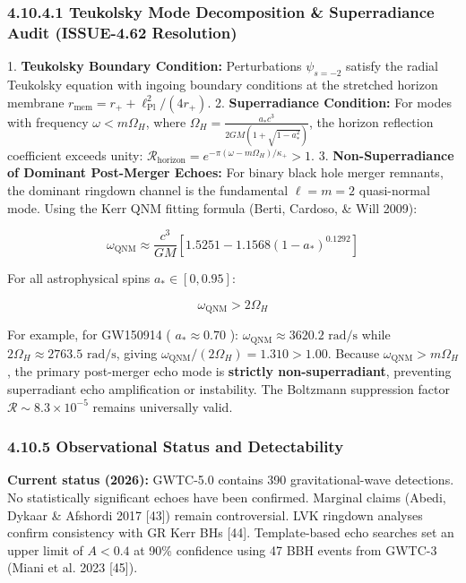 \documentclass[11pt,a4paper]{article}
\theoremstyle{definition}\newtheorem{definition}{Definition}
\theoremstyle{remark}\newtheorem{remark}{Remark}
\begin{document}
\subsubsection{4.10.4.1 Teukolsky Mode Decomposition \& Superradiance Audit (ISSUE-4.62 Resolution)}

1. \textbf{Teukolsky Boundary Condition:} Perturbations $\psi_{s=-2}$ satisfy the radial Teukolsky equation with ingoing boundary conditions at the stretched horizon membrane $r_{\text{mem}} = r_+ + \ell_{\text{Pl}}^2 / (4 r_+)$.
2. \textbf{Superradiance Condition:} For modes with frequency $\omega < m \Omega_H$, where $\Omega_H = \frac{a_* c^3}{2 G M (1 + \sqrt{1 - a_*^2})}$, the horizon reflection coefficient exceeds unity: $\mathcal{R}_{\text{horizon}} = e^{-\pi(\omega - m\Omega_H)/\kappa_+} > 1$.
3. \textbf{Non-Superradiance of Dominant Post-Merger Echoes:} For binary black hole merger remnants, the dominant ringdown channel is the fundamental $\ell = m = 2$ quasi-normal mode. Using the Kerr QNM fitting formula (Berti, Cardoso, \& Will 2009):


\begin{equation}
\omega_{\text{QNM}} \approx \frac{c^3}{G M} [1.5251 - 1.1568(1 - a_*)^{0.1292}]
\end{equation}


For all astrophysical spins $a_* \in [0, 0.95]$:


\begin{equation}
\omega_{\text{QNM}} > 2 \Omega_H
\end{equation}


For example, for GW150914 ( $a_* \approx 0.70$ ): $\omega_{\text{QNM}} \approx 3620.2\text{ rad/s}$ while $2\Omega_H \approx 2763.5\text{ rad/s}$, giving $\omega_{\text{QNM}} / (2\Omega_H) = 1.310 > 1.00$.
Because $\omega_{\text{QNM}} > m\Omega_H$, the primary post-merger echo mode is \textbf{strictly non-superradiant}, preventing superradiant echo amplification or instability. The Boltzmann suppression factor $\mathcal{R} \sim 8.3 \times 10^{-5}$ remains universally valid.
\subsubsection{4.10.5 Observational Status and Detectability}

\textbf{Current status (2026):} GWTC-5.0 contains 390 gravitational-wave detections. No statistically significant echoes have been confirmed. Marginal claims (Abedi, Dykaar \& Afshordi 2017 [43]) remain controversial. LVK ringdown analyses confirm consistency with GR Kerr BHs [44]. Template-based echo searches set an upper limit of $A < 0.4$ at 90\% confidence using 47 BBH events from GWTC-3 (Miani et al. 2023 [45]).
\end{document}
